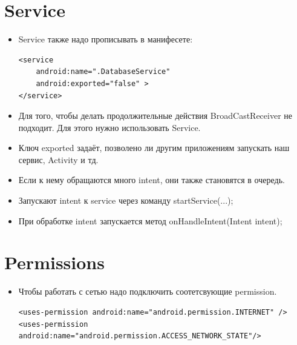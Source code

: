 \documentclass[12 pt]{article}
\begin{document}
    \section{Service}    
    \begin{itemize}
        \item Service также надо прописывать в манифесете:
        \begin{lstlisting}
<service
    android:name=".DatabaseService"
    android:exported="false" >
</service>        
        \end{lstlisting}
        \item Для того, чтобы делать продолжительные действия BroadCastReceiver не подходит. Для этого нужно использовать Service.
        \item Ключ exported задаёт, позволено ли другим приложениям запускать наш сервис, Activity и тд.
        \item Если к нему обращаются много intent, они также становятся в очередь.
        \item Запускают intent к service через команду startService(...);
        \item При обработке intent запускается метод onHandleIntent(Intent intent);
    \end{itemize}
    
\section{Permissions}
    \begin{itemize}
        \item Чтобы работать с сетью надо подключить соотетсвующие permission.
        \begin{lstlisting}
<uses-permission android:name="android.permission.INTERNET" /> 
<uses-permission  android:name="android.permission.ACCESS_NETWORK_STATE"/>        
        \end{lstlisting}
    \end{itemize}
    
\end{document}
